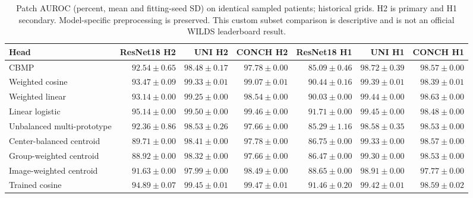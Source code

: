 \begin{table}[p]
\centering\small
\setlength{\tabcolsep}{3pt}
\begin{tabular}{lrrrrrr}
\hline
Head & ResNet18 H2 & UNI H2 & CONCH H2 & ResNet18 H1 & UNI H1 & CONCH H1 \\
\hline
CBMP & $92.54\pm0.65$ & $98.48\pm0.17$ & $97.78\pm0.00$ & $85.09\pm0.46$ & $98.72\pm0.39$ & $98.57\pm0.00$ \\
Weighted cosine & $93.47\pm0.09$ & $99.33\pm0.01$ & $99.07\pm0.01$ & $90.44\pm0.16$ & $99.39\pm0.01$ & $98.39\pm0.01$ \\
Weighted linear & $93.14\pm0.00$ & $99.25\pm0.00$ & $98.54\pm0.00$ & $90.03\pm0.00$ & $99.44\pm0.00$ & $98.63\pm0.00$ \\
Linear logistic & $95.14\pm0.00$ & $99.50\pm0.00$ & $99.46\pm0.00$ & $91.71\pm0.00$ & $99.45\pm0.00$ & $98.48\pm0.00$ \\
Unbalanced multi-prototype & $92.36\pm0.86$ & $98.53\pm0.26$ & $97.66\pm0.00$ & $85.29\pm1.16$ & $98.58\pm0.35$ & $98.53\pm0.00$ \\
Center-balanced centroid & $89.71\pm0.00$ & $98.41\pm0.00$ & $97.78\pm0.00$ & $86.75\pm0.00$ & $99.33\pm0.00$ & $98.57\pm0.00$ \\
Group-weighted centroid & $88.92\pm0.00$ & $98.32\pm0.00$ & $97.66\pm0.00$ & $86.47\pm0.00$ & $99.30\pm0.00$ & $98.53\pm0.00$ \\
Image-weighted centroid & $91.63\pm0.00$ & $97.99\pm0.00$ & $98.49\pm0.00$ & $88.65\pm0.00$ & $98.91\pm0.00$ & $97.77\pm0.00$ \\
Trained cosine & $94.89\pm0.07$ & $99.45\pm0.01$ & $99.47\pm0.01$ & $91.46\pm0.20$ & $99.42\pm0.01$ & $98.59\pm0.02$ \\
\hline
\end{tabular}
\caption{Patch AUROC (percent, mean and fitting-seed SD) on identical sampled patients; historical grids. H2 is primary and H1 secondary. Model-specific preprocessing is preserved. This custom subset comparison is descriptive and is not an official WILDS leaderboard result.}
\label{tab:supp_historical_auroc}
\end{table}
